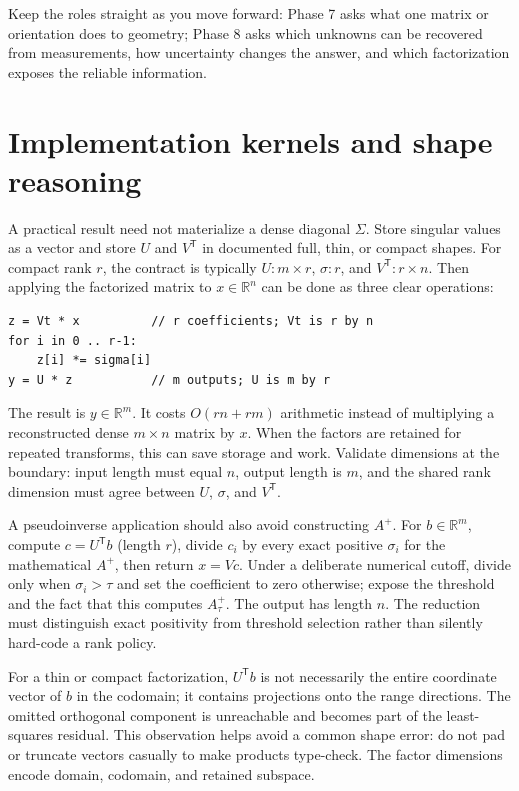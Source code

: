 Keep the roles straight as you move forward: Phase 7 asks what one matrix or orientation does to geometry; Phase 8 asks which unknowns can be recovered from measurements, how uncertainty changes the answer, and which factorization exposes the reliable information.

\section{Implementation kernels and shape reasoning}\label{02-foundations-ii-ch038-implementation-kernels-and-shape-reasoning}

\hypertarget{02-foundations-ii-ch038-implementation-kernels-and-shape-reasoning}{}

A practical result need not materialize a dense diagonal \(\Sigma\). Store singular values as a vector and store \(U\) and \(V^\mathsf T\) in documented full, thin, or compact shapes. For compact rank \(r\), the contract is typically \(U:m\times r\), \(\sigma:r\), and \(V^\mathsf T:r\times n\). Then applying the factorized matrix to \(x\in\mathbb R^n\) can be done as three clear operations:

\begin{verbatim}
z = Vt * x          // r coefficients; Vt is r by n
for i in 0 .. r-1:
    z[i] *= sigma[i]
y = U * z           // m outputs; U is m by r
\end{verbatim}

The result is \(y\in\mathbb R^m\). It costs \(O(rn+rm)\) arithmetic instead of multiplying a reconstructed dense \(m\times n\) matrix by \(x\). When the factors are retained for repeated transforms, this can save storage and work. Validate dimensions at the boundary: input length must equal \(n\), output length is \(m\), and the shared rank dimension must agree between \(U\), \(\sigma\), and \(V^\mathsf T\).

A pseudoinverse application should also avoid constructing \(A^+\). For \(b\in\mathbb R^m\), compute \(c=U^\mathsf T b\) (length \(r\)), divide \(c_i\) by every exact positive \(\sigma_i\) for the mathematical \(A^+\), then return \(x=Vc\). Under a deliberate numerical cutoff, divide only when \(\sigma_i>\tau\) and set the coefficient to zero otherwise; expose the threshold and the fact that this computes \(A_\tau^+\). The output has length \(n\). The reduction must distinguish exact positivity from threshold selection rather than silently hard-code a rank policy.

For a thin or compact factorization, \(U^\mathsf T b\) is not necessarily the entire coordinate vector of \(b\) in the codomain; it contains projections onto the range directions. The omitted orthogonal component is unreachable and becomes part of the least-squares residual. This observation helps avoid a common shape error: do not pad or truncate vectors casually to make products type-check. The factor dimensions encode domain, codomain, and retained subspace.

